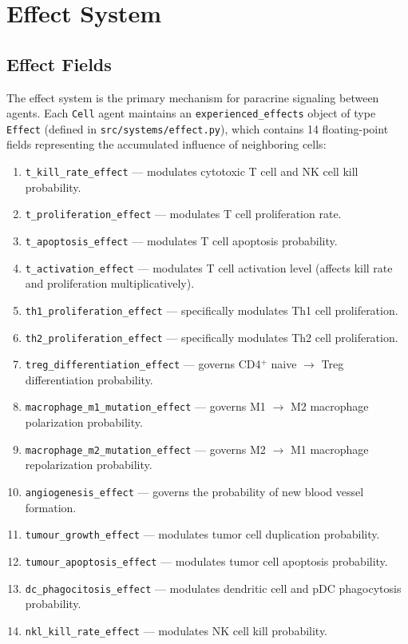 \section{Effect System}
\label{sec:md_effects}

\subsection{Effect Fields}
\label{subsec:md_effect_fields}

The effect system is the primary mechanism for paracrine signaling between agents. Each \texttt{Cell} agent maintains an \texttt{experienced\_effects} object of type \texttt{Effect} (defined in \texttt{src/systems/effect.py}), which contains 14 floating-point fields representing the accumulated influence of neighboring cells:

\begin{enumerate}[nosep]
    \item \texttt{t\_kill\_rate\_effect} --- modulates cytotoxic T cell and NK cell kill probability.
    \item \texttt{t\_proliferation\_effect} --- modulates T cell proliferation rate.
    \item \texttt{t\_apoptosis\_effect} --- modulates T cell apoptosis probability.
    \item \texttt{t\_activation\_effect} --- modulates T cell activation level (affects kill rate and proliferation multiplicatively).
    \item \texttt{th1\_proliferation\_effect} --- specifically modulates Th1 cell proliferation.
    \item \texttt{th2\_proliferation\_effect} --- specifically modulates Th2 cell proliferation.
    \item \texttt{treg\_differentiation\_effect} --- governs CD4$^+$ naive $\to$ Treg differentiation probability.
    \item \texttt{macrophage\_m1\_mutation\_effect} --- governs M1 $\to$ M2 macrophage polarization probability.
    \item \texttt{macrophage\_m2\_mutation\_effect} --- governs M2 $\to$ M1 macrophage repolarization probability.
    \item \texttt{angiogenesis\_effect} --- governs the probability of new blood vessel formation.
    \item \texttt{tumour\_growth\_effect} --- modulates tumor cell duplication probability.
    \item \texttt{tumour\_apoptosis\_effect} --- modulates tumor cell apoptosis probability.
    \item \texttt{dc\_phagocitosis\_effect} --- modulates dendritic cell and pDC phagocytosis probability.
    \item \texttt{nkl\_kill\_rate\_effect} --- modulates NK cell kill probability.
\end{enumerate}

